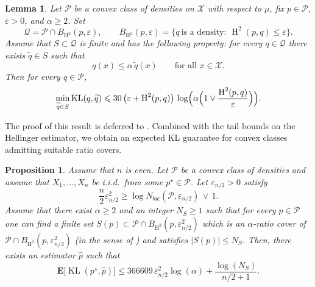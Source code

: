 \documentclass[11pt]{article}
\newcommand{\E}{{\mathbf E}}
\renewcommand{\le}{\leqslant}
\renewcommand{\ge}{\geqslant}
\newcommand{\eps}{\varepsilon}
\newcommand{\X}{\mathcal{X}}
\newcommand{\nloc}{N_{\mathsf{loc}}}
\renewcommand{\triangleq}{=}
\renewcommand{\tilde}{\widetilde}
\newcommand{\kl}{\operatorname{KL}}
\newcommand{\hel}{\operatorname{H}}
\newcommand{\hels}{\hel^2}
\newtheorem{proposition}{Proposition}
\newtheorem{lemma}{Lemma}
\theoremstyle{definition}
\theoremstyle{remark}
\begin{document}
\begin{lemma}\label{lemma:kl-from-ball}
Let $\mathcal P$ be a convex class of densities on $\X$ with respect to $\mu$, fix $p\in\mathcal P$, $\eps>0$, and $\alpha\ge 2$.
Set
\[
\mathcal Q \triangleq \mathcal P \cap B_{\hels}(p,\eps),
\qquad
B_{\hels}(p,\eps)\triangleq\{q\ \text{is a density}:\ \hels(p,q)\le \eps\}.
\]
Assume that $S\subset \mathcal Q$ is finite and has the following property: for every $q\in\mathcal Q$ there exists $\tilde q\in S$ such that
\[
q(x)\le \alpha\,\tilde q(x)\qquad\text{for all }x\in\X.
\]
Then for every $q\in\mathcal P$,
\[
\min_{\tilde q\in S}\kl(q,\tilde q)
\le
30\,\bigl(\eps+\hels(p,q)\bigr)\,
\log\Bigl(\alpha\Bigl(1\vee \frac{\hels(p,q)}{\eps}\Bigr)\Bigr).
\]
\end{lemma}

The proof of this result is deferred to . Combined with the tail bounds on the Hellinger estimator, we obtain an expected KL guarantee for convex classes admitting suitable ratio covers.

\begin{proposition}\label{prop:expected-recipe}
Assume that $n$ is even.
Let $\mathcal{P}$ be a convex class of densities and assume that $X_1,\ldots,X_n$ be i.i.d.\ from some $p^\star\in\mathcal{P}$.
Let $\eps_{n/2}>0$ satisfy
\[
\frac{n}{2}\eps_{n/2}^2 \ge \log \nloc(\mathcal{P},\eps_{n/2})\,\lor\,1.
\]
Assume that there exist $\alpha\ge 2$ and an integer $N_S\ge 1$ such that for every $p\in\mathcal{P}$ one can find a finite set
$S(p)\subset \mathcal{P}\cap B_{\hels}(p,\eps_{n/2}^2)$ which is an $\alpha$-ratio cover of $\mathcal{P}\cap B_{\hels}(p,\eps_{n/2}^2)$ (in the sense of ) and satisfies $|S(p)|\le N_S$.
Then, there exists an estimator $\widehat{p}$ such that
\[
\E\big[\kl(p^\star,\widehat{p})\big]
\le
366609\,\eps_{n/2}^2 \log(\alpha) + \frac{\log(N_S)}{n/2+1}.
\]
\end{proposition}
\end{document}
